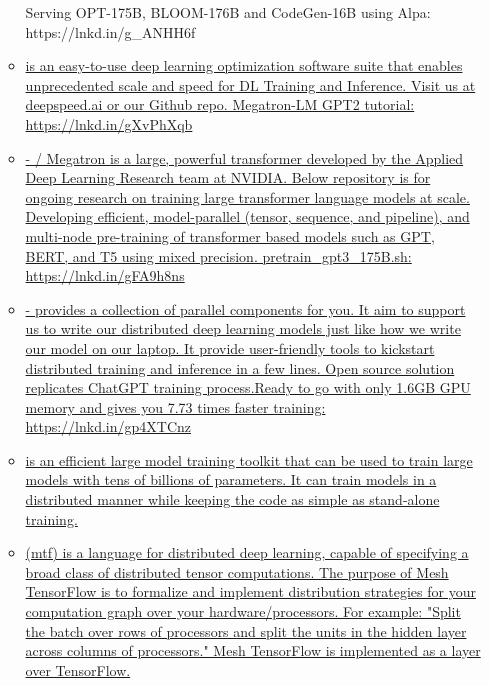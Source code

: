 \begin{itemize}
\begin{itemize}
    Serving OPT-175B, BLOOM-176B and CodeGen-16B using Alpa:
    https://lnkd.in/g\_ANHH6f
  \item
    \href{https://github.com/microsoft/DeepSpeed}{is an easy-to-use deep
    learning optimization software suite that enables unprecedented
    scale and speed for DL Training and Inference. Visit us at
    deepspeed.ai or our Github repo. Megatron-LM GPT2 tutorial:
    https://lnkd.in/gXvPhXqb}
  \item
    \href{https://github.com/NVIDIA/Megatron-LM}{- / Megatron is a
    large, powerful transformer developed by the Applied Deep Learning
    Research team at NVIDIA. Below repository is for ongoing research on
    training large transformer language models at scale. Developing
    efficient, model-parallel (tensor, sequence, and pipeline), and
    multi-node pre-training of transformer based models such as GPT,
    BERT, and T5 using mixed precision. pretrain\_gpt3\_175B.sh:
    https://lnkd.in/gFA9h8ns}
  \item
    \href{https://colossalai.org/}{- provides a collection of parallel
    components for you. It aim to support us to write our distributed
    deep learning models just like how we write our model on our laptop.
    It provide user-friendly tools to kickstart distributed training and
    inference in a few lines. Open source solution replicates ChatGPT
    training process.Ready to go with only 1.6GB GPU memory and gives
    you 7.73 times faster training: https://lnkd.in/gp4XTCnz}
  \item
    \href{https://github.com/OpenBMB/BMTrain}{is an efficient large
    model training toolkit that can be used to train large models with
    tens of billions of parameters. It can train models in a distributed
    manner while keeping the code as simple as stand-alone training.}
  \item
    \href{https://github.com/tensorflow/mesh}{(mtf) is a language for
    distributed deep learning, capable of specifying a broad class of
    distributed tensor computations. The purpose of Mesh TensorFlow is
    to formalize and implement distribution strategies for your
    computation graph over your hardware/processors. For example: "Split
    the batch over rows of processors and split the units in the hidden
    layer across columns of processors." Mesh TensorFlow is implemented
    as a layer over TensorFlow.}
  \end{itemize}
\end{itemize}
